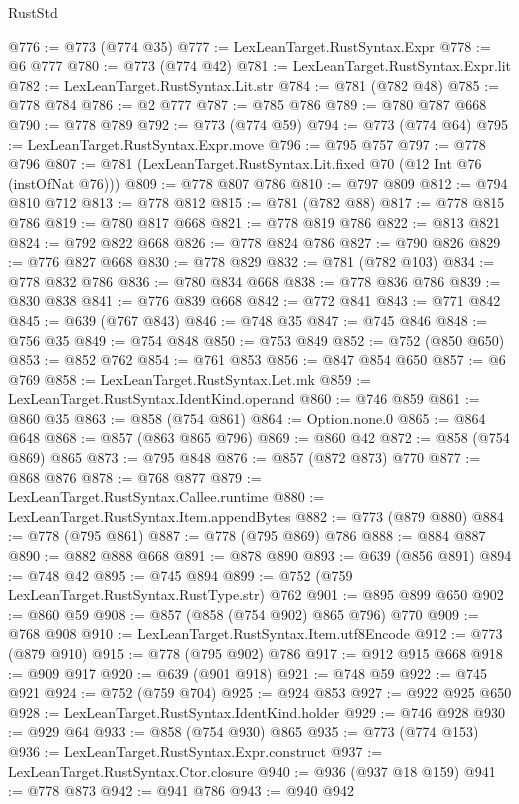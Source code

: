 \begin{lexlean}{RustStd}
\begin{coremodule}
@776 := @773 (@774 @35)
@777 := LexLeanTarget.RustSyntax.Expr
@778 := @6 @777
@780 := @773 (@774 @42)
@781 := LexLeanTarget.RustSyntax.Expr.lit
@782 := LexLeanTarget.RustSyntax.Lit.str
@784 := @781 (@782 @48)
@785 := @778 @784
@786 := @2 @777
@787 := @785 @786
@789 := @780 @787 @668
@790 := @778 @789
@792 := @773 (@774 @59)
@794 := @773 (@774 @64)
@795 := LexLeanTarget.RustSyntax.Expr.move
@796 := @795 @757
@797 := @778 @796
@807 := @781 (LexLeanTarget.RustSyntax.Lit.fixed @70 (@12 Int @76 (instOfNat @76)))
@809 := @778 @807 @786
@810 := @797 @809
@812 := @794 @810 @712
@813 := @778 @812
@815 := @781 (@782 @88)
@817 := @778 @815 @786
@819 := @780 @817 @668
@821 := @778 @819 @786
@822 := @813 @821
@824 := @792 @822 @668
@826 := @778 @824 @786
@827 := @790 @826
@829 := @776 @827 @668
@830 := @778 @829
@832 := @781 (@782 @103)
@834 := @778 @832 @786
@836 := @780 @834 @668
@838 := @778 @836 @786
@839 := @830 @838
@841 := @776 @839 @668
@842 := @772 @841
@843 := @771 @842
@845 := @639 (@767 @843)
@846 := @748 @35
@847 := @745 @846
@848 := @756 @35
@849 := @754 @848
@850 := @753 @849
@852 := @752 (@850 @650)
@853 := @852 @762
@854 := @761 @853
@856 := @847 @854 @650
@857 := @6 @769
@858 := LexLeanTarget.RustSyntax.Let.mk
@859 := LexLeanTarget.RustSyntax.IdentKind.operand
@860 := @746 @859
@861 := @860 @35
@863 := @858 (@754 @861)
@864 := Option.none.{0}
@865 := @864 @648
@868 := @857 (@863 @865 @796)
@869 := @860 @42
@872 := @858 (@754 @869) @865
@873 := @795 @848
@876 := @857 (@872 @873) @770
@877 := @868 @876
@878 := @768 @877
@879 := LexLeanTarget.RustSyntax.Callee.runtime
@880 := LexLeanTarget.RustSyntax.Item.appendBytes
@882 := @773 (@879 @880)
@884 := @778 (@795 @861)
@887 := @778 (@795 @869) @786
@888 := @884 @887
@890 := @882 @888 @668
@891 := @878 @890
@893 := @639 (@856 @891)
@894 := @748 @42
@895 := @745 @894
@899 := @752 (@759 LexLeanTarget.RustSyntax.RustType.str) @762
@901 := @895 @899 @650
@902 := @860 @59
@908 := @857 (@858 (@754 @902) @865 @796) @770
@909 := @768 @908
@910 := LexLeanTarget.RustSyntax.Item.utf8Encode
@912 := @773 (@879 @910)
@915 := @778 (@795 @902) @786
@917 := @912 @915 @668
@918 := @909 @917
@920 := @639 (@901 @918)
@921 := @748 @59
@922 := @745 @921
@924 := @752 (@759 @704)
@925 := @924 @853
@927 := @922 @925 @650
@928 := LexLeanTarget.RustSyntax.IdentKind.holder
@929 := @746 @928
@930 := @929 @64
@933 := @858 (@754 @930) @865
@935 := @773 (@774 @153)
@936 := LexLeanTarget.RustSyntax.Expr.construct
@937 := LexLeanTarget.RustSyntax.Ctor.closure
@940 := @936 (@937 @18 @159)
@941 := @778 @873
@942 := @941 @786
@943 := @940 @942

\end{coremodule}
\end{lexlean}
